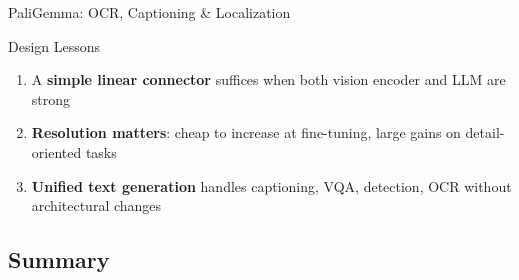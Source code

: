 \begin{frame}{PaliGemma: OCR, Captioning \& Localization}
  \vspace{0.3em}
  \begin{block}{Design Lessons}
    \begin{enumerate}
      \item A \textbf{simple linear connector} suffices when both vision encoder and LLM are strong
      \item \textbf{Resolution matters}: cheap to increase at fine-tuning, large gains on detail-oriented tasks
      \item \textbf{Unified text generation} handles captioning, VQA, detection, OCR without architectural changes
    \end{enumerate}
  \end{block}
\end{frame}

\subsection{Summary}

